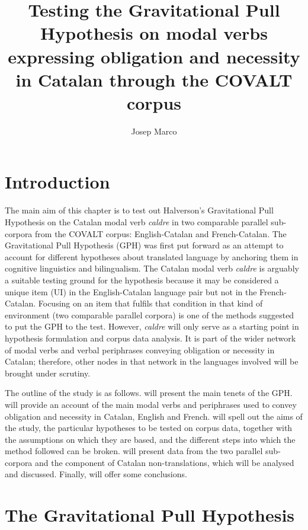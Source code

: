 \documentclass[output=paper,english,spanish,german,english]{langsci/langscibook}
\author{Josep Marco\affiliation{Universitat Jaume I}}
\title[Testing the Gravitational Pull Hypothesis on verbs in Catalan]{Testing the Gravitational Pull Hypothesis on modal verbs expressing obligation and necessity in Catalan through the COVALT corpus}
\begin{document}
\maketitle

\section{Introduction}

The main aim of this chapter is to test out Halverson’s Gravitational Pull Hypothesis \parencites*{halverson03}{halverson10}{halverson17} on the Catalan modal verb \textit{caldre} in two comparable parallel sub-corpora from the COVALT corpus: English-Catalan and French-Catalan. The Gravitational Pull Hypothesis (GPH) was first put forward as an attempt to account for different hypotheses about translated language by anchoring them in cognitive linguistics and bilingualism. The Catalan modal verb \textit{caldre} is arguably a suitable testing ground for the hypothesis because it may be considered a unique item (UI) in the English-Catalan language pair but not in the French-Catalan. Focusing on an item that fulfils that condition in that kind of environment (two comparable parallel corpora) is one of the methods suggested \parencite{hareide17} to put the GPH to the test. However, \textit{caldre} will only serve as a starting point in hypothesis formulation and corpus data analysis. It is part of the wider network of modal verbs and verbal periphrases conveying obligation or necessity in Catalan; therefore, other nodes in that network in the languages involved will be brought under scrutiny. 

The outline of the study is as follows.  will present the main tenets of the GPH.  will provide an account of the main modal verbs and periphrases used to convey obligation and necessity in Catalan, English and French.  will spell out the aims of the study, the particular hypotheses to be tested on corpus data, together with the assumptions on which they are based, and the different steps into which the method followed can be broken.  will present data from the two parallel sub-corpora and the component of Catalan non-translations, which will be analysed and discussed. Finally,  will offer some conclusions.

\section{The Gravitational Pull Hypothesis}\label{gph}
\end{document}
